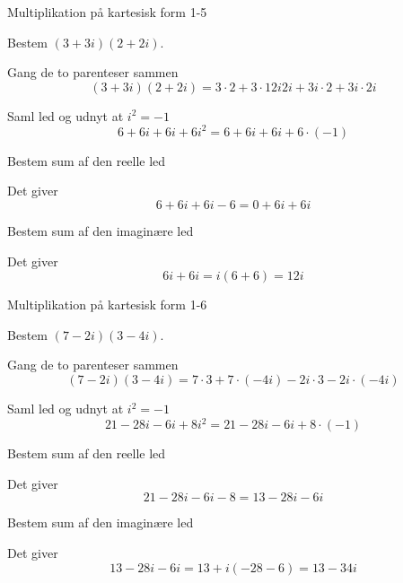 \documentclass{article}
\begin{document}
\newpage

\begin{exercise}{Multiplikation på kartesisk form 1-5}
	
	Bestem $(3+3i)(2+2i)$.
	
	
	\hint
	
	Gang de to parenteser sammen
	\[
	(3+3i)(2+2i)  = 3 \cdot 2 + 3 \cdot12i 2i + 3i \cdot 2 + 3i \cdot 2i
	\]
	
	\hint 
	
	Saml led og udnyt at $i^2 = -1$
	\[
	6 + 6i + 6i + 6i^2 = 6+ 6i + 6i + 6 \cdot (-1)
	\]
	
	\hint
	
	Bestem sum af den reelle led
	
	\hint
	
	Det giver
	\[
	6+ 6i + 6i - 6 = 0 + 6i + 6i
	\]
	
	\hint
	
	Bestem sum af den imaginære led
	
	
	\hint
	
	Det giver 
	\[
	6i + 6i = i(6+6) = 12i
	\]
	
\end{exercise}

\newpage

\begin{exercise}{Multiplikation på kartesisk form 1-6}
	
	Bestem $(7-2i)(3-4i)$.
	
	
	\hint
	
	Gang de to parenteser sammen
	\[
	(7-2i)(3-4i) = 7 \cdot 3 + 7 \cdot (-4i) - 2i \cdot 3 - 2i \cdot (-4i)
	\]
	
	\hint 
	
	Saml led og udnyt at $i^2 = -1$
	\[
	21 -28i -6i + 8i^2  = 21 -28i -6i + 8 \cdot (-1)
	\]
	
	\hint
	
	Bestem sum af den reelle led
	
	\hint
	
	Det giver
	\[
	21 -28i -6i - 8	= 13 -28i -6i
	\]
	
	\hint
	
	Bestem sum af den imaginære led
	
	
	\hint
	
	Det giver 
	\[
	13 -28i -6i = 13 + i(-28-6) = 13 - 34i
	\]
	
\end{exercise}
\end{document}
